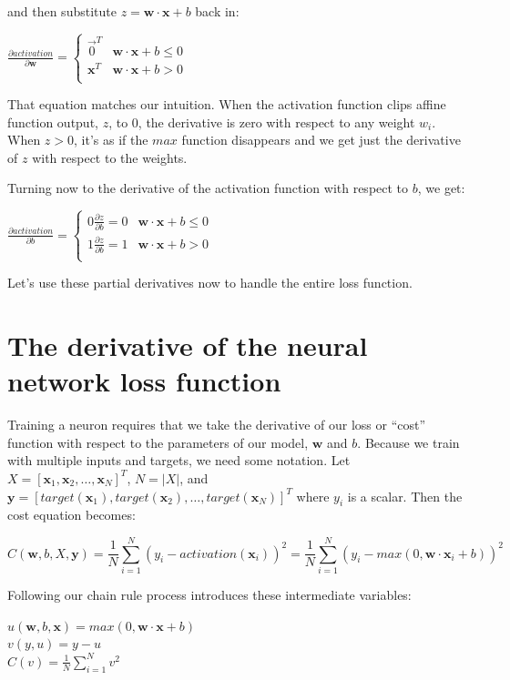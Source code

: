 \documentclass[11pt]{article}
\begin{document}
and then substitute $z = \mathbf{w} \cdot \mathbf{x} + b$ back in:
 
$\frac{\partial activation}{\partial \mathbf{w}} = \begin{cases}
	\vec{0}^T & \mathbf{w} \cdot \mathbf{x} + b \leq 0\\
	\mathbf{x}^T & \mathbf{w} \cdot \mathbf{x} + b > 0\\
\end{cases}$

That equation matches our intuition.  When the activation function clips affine function output, $z$, to 0, the derivative is zero with respect to any weight $w_i$. When $z > 0$, it's as if the $max$ function disappears and we get just the derivative of $z$ with respect to the weights. 

Turning now to the derivative of the activation function with respect to $b$, we get:
 
$\frac{\partial activation}{\partial b} = \begin{cases}
	0\frac{\partial z}{\partial b} = 0 & \mathbf{w} \cdot \mathbf{x} + b \leq 0\\
	1\frac{\partial z}{\partial b} = 1 & \mathbf{w} \cdot \mathbf{x} + b > 0\\
\end{cases}
$

Let's use these partial derivatives now to handle the entire loss function.

\section{The derivative of the neural network loss function}

Training a neuron requires that we take the derivative of our loss  or ``cost'' function with respect to the parameters of our model, $\mathbf{w}$ and $b$. Because we train with multiple inputs and targets, we need some notation. Let $X = [\mathbf{x}_1, \mathbf{x}_2, \ldots, \mathbf{x}_N]^T$, $N=|X|$, and $\mathbf{y} = [target(\mathbf{x}_1), target(\mathbf{x}_2), \ldots, target(\mathbf{x}_N)]^T$ where $y_i$ is a scalar. Then the cost equation becomes:

\[
C(\mathbf{w},b,X,\mathbf{y}) = \frac{1}{N} \sum_{i=1}^{N} (y_i - activation(\mathbf{x}_i))^2 = \frac{1}{N} \sum_{i=1}^{N} (y_i - max(0, \mathbf{w}\cdot\mathbf{x}_i+b))^2
\]

Following our chain rule process introduces these intermediate variables:
 
$u(\mathbf{w},b,\mathbf{x}) = max(0, \mathbf{w}\cdot\mathbf{x}+b)$\\
$v(y,u) = y - u$\\
$C(v) = \frac{1}{N} \sum_{i=1}^N v^2$
\end{document}

